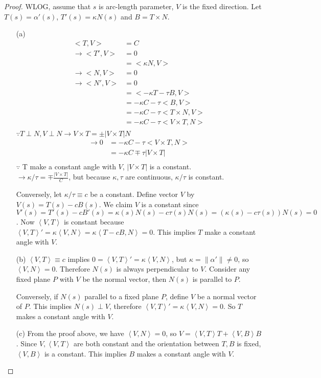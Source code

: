 \documentclass[10pt,a4paper]{article}
\begin{document}
\begin{proof}
WLOG, assume that $s$ is arc-length parameter, $V$ is the fixed direction. Let $T(s)=\alpha'(s)$, $T'(s)=\kappa N(s)$ and $B=T\times N$.
\begin{enumerate}
\item[]
\item[(a)]
\begin{align*}
<T,V>&=C\\
\rightarrow <T',V>&=0\\
&=<\kappa N,V>\\
\rightarrow <N,V>&=0\\
\rightarrow <N',V>&=0\\
&=<-\kappa T-\tau B,V>\\
&=-\kappa C-\tau <B,V>\\
&=-\kappa C-\tau <T\times N,V>\\
&=-\kappa C-\tau <V\times T,N>\\
\end{align*}
$\because T\perp N, V\perp N\rightarrow V\times T=\pm\left|V\times T\right|N$\\
\begin{align*}
\rightarrow 0&=-\kappa C-\tau <V\times T,N>\\
&=-\kappa C\mp\tau\left|V\times T\right|\\
\end{align*}
$\because$ T make a constant angle with $V$, $\left|V\times T\right|$ is a constant.\\
$\rightarrow \kappa/\tau=\mp\frac{\left|V\times T\right|}{C}$, but because $\kappa, \tau$ are continuous, $\kappa/\tau$ is constant.

Conversely, let $\kappa/\tau\equiv c$ be a constant. Define vector $V$ by $V(s) = T(s)-cB(s)$. We claim $V$ is a constant since $V'(s)=T'(s)-cB'(s)=\kappa(s) N(s) - c\tau(s) N(s) = (\kappa(s)-c\tau(s))N(s)=0$. Now $\left\langle V, T\right\rangle$ is constant because $\left\langle V, T\right\rangle'=\kappa\left\langle V,N\right\rangle = \kappa\left\langle T-cB, N\right\rangle = 0$. This implies $T$ make a constant angle with $V$.
\item[(b)]
$\left\langle V, T\right\rangle \equiv c$ implies $0=\left\langle V, T\right\rangle' = \kappa\left\langle V, N\right\rangle$, but $\kappa = \|\alpha'\|\ne 0$, so $\left\langle V, N\right\rangle=0$. Therefore $N(s)$ is always perpendicular to $V$. Consider any fixed plane $P$ with $V$ be the normal vector, then $N(s)$ is parallel to $P$.

Conversely, if $N(s)$ parallel to a fixed plane $P$, define $V$ be a normal vector of $P$. This implies $N(s)\perp V$, therefore $\left\langle V, T\right\rangle' = \kappa\left\langle V, N\right\rangle = 0$. So $T$ makes a constant angle with $V$.
\item[(c)]
From the proof above, we have $\left\langle V, N\right\rangle = 0$, so $V = \left\langle V, T\right\rangle T + \left\langle V, B\right\rangle B$. Since $V, \left\langle V, T\right\rangle$ are both constant and the orientation between $T, B$ is fixed, $\left\langle V, B\right\rangle$ is a constant. This implies $B$ makes a constant angle with $V$.


\end{enumerate}
\end{proof}
\end{document}
